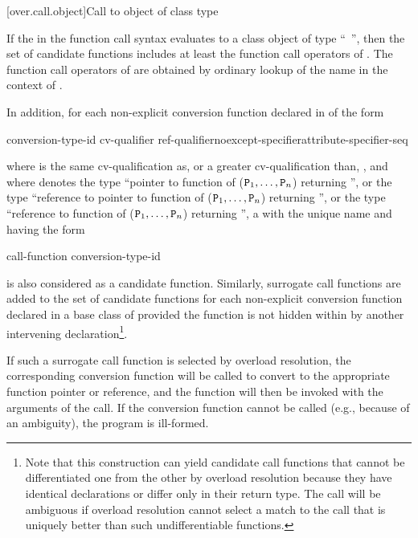 [over.call.object]{Call to object of class type}

\pnum
If the
in the function call syntax evaluates
to a class object of type ``\cv{}~'',
then the set of candidate
functions includes at least the function call operators of
.
The
function call operators of
are obtained by ordinary lookup of
the name
in the context of
.

\pnum
In addition, for each non-explicit conversion function declared in  of the
form

\begin{ncsimplebnf}
 conversion-type-id \terminal{(\,)} cv-qualifier ref-qualifier\opt noexcept-specifier\opt attribute-specifier-seq\opt{} \terminal{;}
\end{ncsimplebnf}

where
is the same cv-qualification as, or a greater cv-qualification than,
\cv{},
and where
denotes the type ``pointer to function
of ($\texttt{P}_1, \dotsc, \texttt{P}_n$) returning '',
or the type ``reference to pointer to function
of ($\texttt{P}_1, \dotsc, \texttt{P}_n$) returning '',
or the type
``reference to function of ($\texttt{P}_1, \dotsc, \texttt{P}_n$)
returning '', a  with the unique name
and having the form

\begin{ncbnf}
 call-function \terminal{(} conversion-type-id \ %
 
\end{ncbnf}

is also considered as a candidate function.
Similarly, surrogate
call functions are added to the set of candidate functions for
each non-explicit conversion function declared in a base class of
provided the function is not hidden within
by another
intervening declaration\footnote{Note that this construction can yield
candidate call functions that cannot be
differentiated one from the other by overload resolution because they have
identical
declarations or differ only in their return type.
The call will be ambiguous
if overload
resolution cannot select a match to the call that is uniquely better than such
undifferentiable functions.}.

\pnum
If such a surrogate call function is selected by overload
resolution, the corresponding conversion function will be called to convert
to the appropriate function pointer or reference, and the function
will then be invoked with the arguments of the call. If the
conversion function cannot be called (e.g., because of an ambiguity),
the program is ill-formed.


